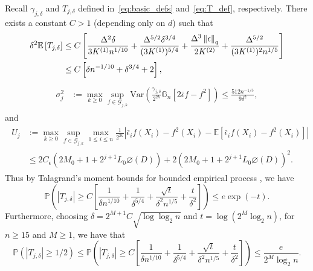 \begin{lemma}\label{lem:Talagrand}
Recall $\gamma_{j,\delta}$ and $T_{j,\delta}$ defined in~\eqref{eq:basic_defs} and~\eqref{eq:T_def}, respectively. There exists a constant $C>1$ (depending only on $d$) such that 
\begin{align}\label{eq:ET_bound}
\begin{split}
{\delta^2\mathbb{E}\left[T_{j,\delta}\right]} &\le C\left[\frac{\Delta^2\delta}{3K^{(1)}n^{1/10}} + \frac{\Delta^{5/2}\delta^{3/4}}{(3K^{(1)})^{5/4}} + \frac{\Delta^3\left\lVert\epsilon\right\rVert_q}{2K^{(2)}} + \frac{\Delta^{5/2}}{(3K^{(1)})^2n^{1/5}}\right]\\
&\le C \left[\delta n^{-1/10} + \delta^{3/4} +2\right],
\end{split}
\end{align}
\begin{align}\label{eq:wimpY_var}
\begin{split}
\sigma_j^2 &:= \max_{k \ge 0}\sup_{f\in\mathcal{G}_{j,k}} \mbox{Var}\left(\frac{\gamma_{j,\delta}}{2^{2k}}\mathbb{G}_n[2\bar\epsilon  f - f^2]\right) \le \frac{512n^{-1/5}}{9\delta^2},
\end{split}
\end{align}
and 
\begin{align}\label{eq:U_bound}
\begin{split}
U_{j} &:= \max_{k \ge 0}\sup_{f\in\mathcal{G}_{j,k}}\max_{1\le i\le n} \frac{1}{2^{2k}}\left|\bar\epsilon_{i}f(X_i) - f^2(X_i) - \mathbb{E}\left[\bar\epsilon_{i}f(X_i) - f^2(X_i)\right]\right|\\
&\le 2 C_{\epsilon}(2M_0 + 1 + 2^{j+1}L_0\diameter(D)) + 2(2M_0 + 1 + 2^{j+1}L_0\diameter(D))^2.
\end{split}
\end{align}
Thus by  Talagrand's moment bounds for bounded empirical process
, we have
\begin{equation}\label{eq:TjTailBound_lemma}
\mathbb{P}\left(|T_{j,\delta}| \ge C\left[\frac{1}{\delta n^{1/10}} + \frac{1}{\delta^{5/4}} + \frac{\sqrt{t}}{\delta^2 n^{1/5}} + \frac{t}{\delta^2}\right]\right) \le e\exp(-t).
\end{equation}
Furthermore, choosing $\delta = 2^{{M+1}}C \sqrt{\log \log_2 n}$ and $t= \log(2^M \log_2 n)$, for $n \ge 15$ and $M \ge 1$, we have that 
\begin{equation}\label{eq:TjTailBoundFinal}
\mathbb{P}\left(|T_{j,\delta}| \ge 1/2\right) \le \mathbb{P}\left(|T_{j,\delta}| \ge C\left[\frac{1}{\delta n^{1/10}} + \frac{1}{\delta^{5/4}} + \frac{\sqrt{t}}{\delta^2 n^{1/5}} + \frac{t}{\delta^2}\right]\right) \le \frac{e}{2^M \log_2n}.
\end{equation}

\end{lemma}

